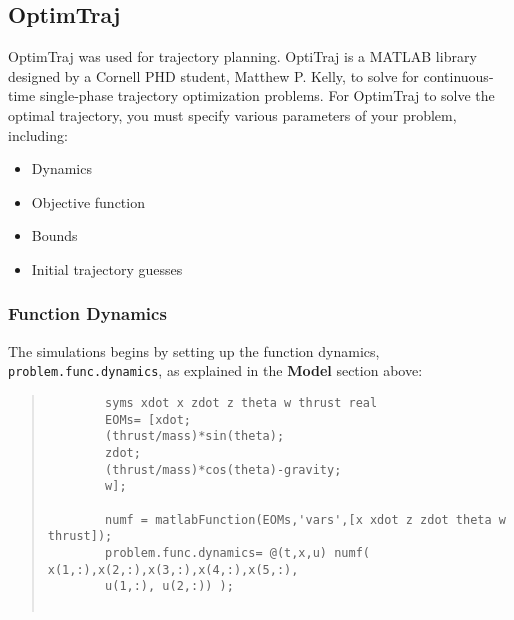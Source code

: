 \documentclass[12pt]{article}
\begin{document}
	\subsection{OptimTraj}
	
	OptimTraj \cite{OptimTraj} was used for trajectory planning. OptiTraj is a MATLAB library designed by a Cornell PHD student, Matthew P. Kelly, to solve for continuous-time single-phase trajectory optimization problems. For OptimTraj to solve the optimal trajectory, you must specify various parameters of your problem, including:
	\begin{itemize}
		\item Dynamics
		\item Objective function
		\item Bounds
		\item Initial trajectory guesses
	\end{itemize}
	
	\subsubsection{Function Dynamics}
	The simulations begins by setting up the function dynamics, \lstinline!problem.func.dynamics!, as explained in the \textbf{Model} section above: 
	\begin{quote}
		\begin{lstlisting}
		syms xdot x zdot z theta w thrust real
		EOMs= [xdot;
		(thrust/mass)*sin(theta);
		zdot;
		(thrust/mass)*cos(theta)-gravity;
		w];
		
		numf = matlabFunction(EOMs,'vars',[x xdot z zdot theta w thrust]);
		problem.func.dynamics= @(t,x,u) numf( x(1,:),x(2,:),x(3,:),x(4,:),x(5,:),
		u(1,:), u(2,:)) );
		
		\end{lstlisting}
	\end{quote}
	
\end{document}
